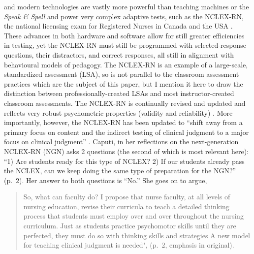 \documentclass[
]{book}
\begin{document}
and modern technologies are vastly more powerful than teaching machines or the \emph{Speak \& Spell} and power very complex adaptive tests, such as the NCLEX-RN, the national licensing exam for Registered Nurses in Canada and the USA \citep{smithglasgowStandardizedTestingNursing2019}. These advances in both hardware and software allow for still greater efficiencies in testing, yet the NCLEX-RN must still be programmed with selected-response questions, their distractors, and correct responses, all still in alignment with behavioural models of pedagogy. The NCLEX-RN is an example of a large-scale, standardized assessment (LSA), so is not parallel to the classroom assessment practices which are the subject of this paper, but I mention it here to draw the distinction between professionally-created LSAs and most instructor-created classroom assessments. The NCLEX-RN is continually revised and updated and reflects very robust psychometric properties (validity and reliability) \citep{smithglasgowStandardizedTestingNursing2019}. More importantly, however, the NCLEX-RN has been updated to ``shift away from a primary focus on content and the indirect testing of clinical judgment to a major focus on clinical judgment'' \citep[p.~2]{caputiReflectionsNextGeneration2019}. Caputi, in her reflections on the next-generation NCLEX-RN (NGN) asks 2 questions (the second of which is most relevant here): ``1) Are students ready for this type of NCLEX? 2) If our students already pass the NCLEX, can we keep doing the same type of preparation for the NGN?'' (p.~2). Her answer to both questions is ``No.'' She goes on to argue,

\begin{quote}
So, what can faculty do? I propose that nurse faculty, at all levels of nursing education, revise their curricula to teach a detailed thinking process that students must employ over and over throughout the nursing curriculum. Just as students practice psychomotor skills until they are perfected, they must do so with thinking skills and strategies A new model for teaching clinical judgment is needed", (p.~2, emphasis in original).
\end{quote}
\end{document}
